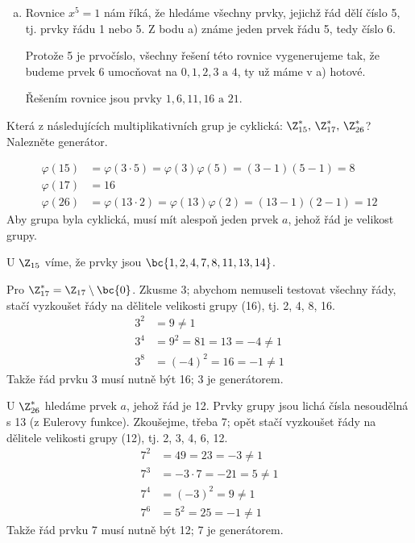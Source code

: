 \documentclass[11pt, a4paper]{article}
\DeclareMathOperator*{\ra}{r}
\begin{document}
\begin{solution}
\begin{enumerate}[a)]
	Musí tedy platit
	\begin{equation}
		4 = \frac{20}{\gcd(k, 20)}.
	\end{equation}
	Z toho plyne $\gcd(k, 20) = 5$. To platí pro $k \in \bc{5, 15}$, takže hledané prvky budou $2^5$ a $2^{15}$.
	\begin{align*}
		2^5 &= 32 = 7 \\
		2^{15} &= \left(2^5\right)^3 =7^3 = 343 = 18
	\end{align*} 
	Takže $\ra(7) = \ra(18) = 4$.
	\item Rovnice $x^5 = 1$ nám říká, že hledáme všechny prvky, jejichž řád dělí číslo 5, tj. prvky řádu 1 nebo 5. Z bodu a) známe jeden prvek řádu 5, tedy číslo 6.

	Protože 5 je prvočíslo, všechny řešení této rovnice vygenerujeme tak, že budeme prvek 6 umocňovat na $0, 1, 2, 3 \text{ a } 4$, ty už máme v a) hotové.

	Řešením rovnice jsou prvky $1, 6, 11, 16 \text{ a } 21$.
\end{enumerate}
\end{solution}

\begin{exercise}
Která z následujících multiplikativních grup je cyklická: $\Z_{15}^*,\, \Z_{17}^*,\,\Z_{26}^*$? Nalezněte generátor.
\end{exercise}
\begin{solution}
\begin{align*}
	\varphi(15) &= \varphi(3 \cdot 5) = \varphi(3) \varphi(5) = (3-1)(5-1) = 8 \\
	\varphi(17) &= 16 \\
	\varphi(26) &= \varphi(13 \cdot 2) = \varphi(13) \varphi(2) = (13-1)(2-1) = 12
\end{align*}
Aby grupa byla cyklická, musí mít alespoň jeden prvek $a$, jehož řád je velikost grupy.

U $\Z_{15}$ víme, že prvky jsou $\bc{1, 2, 4, 7, 8, 11, 13, 14}$.

Pro $\Z_{17}^* = \Z_{17} \setminus \bc{0}$. Zkusme 3; abychom nemuseli testovat všechny řády, stačí vyzkoušet řády na dělitele velikosti grupy (16), tj. 2, 4, 8, 16.
\begin{align*}
	3^2 &= 9 \not=1 \\
	3^4 &= 9^2 = 81 = 13 = -4 \not=1 \\
	3^8 &= (-4)^2 = 16 = -1 \not=1
\end{align*}
Takže řád prvku 3 musí nutně být 16; 3 je generátorem.

U $\Z_{26}^*$ hledáme prvek $a$, jehož řád je 12. Prvky grupy jsou lichá čísla nesoudělná s 13 (z Eulerovy funkce). Zkoušejme, třeba 7; opět stačí vyzkoušet řády na dělitele velikosti grupy (12), tj. 2, 3, 4, 6, 12.
\begin{align*}
	7^2 &= 49 = 23 = -3 \not=1 \\
	7^3 &= -3 \cdot 7 = -21 = 5 \not=1 \\
	7^4 &= (-3)^2 = 9 \not=1 \\
	7^6 &= 5^2 = 25 = -1 \not=1 
\end{align*}
Takže řád prvku 7 musí nutně být 12; 7 je generátorem.
\end{solution}
\end{document}
